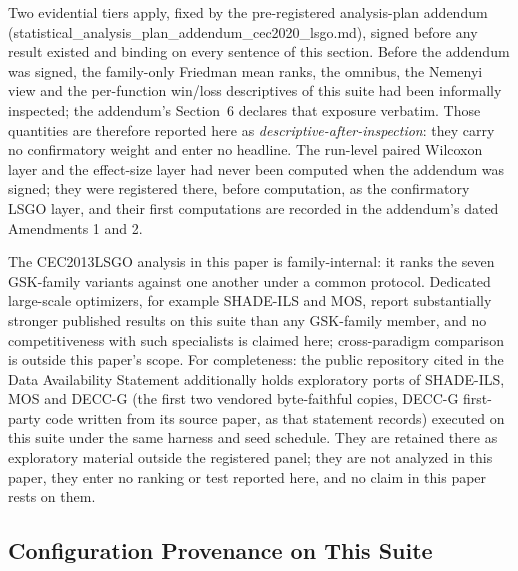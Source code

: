 \documentclass[algorithms,article,submit,moreauthors,pdftex]{Definitions/mdpi}
\begin{document}
Two evidential tiers apply, fixed by the pre-registered analysis-plan
addendum (statistical\_analysis\_plan\_addendum\_cec2020\_lsgo.md), signed
before any result existed and binding on every sentence of this section.
Before the addendum was signed, the family-only Friedman mean ranks, the
omnibus, the Nemenyi view and the per-function win/loss descriptives of
this suite had been informally inspected; the addendum's Section~6
declares that exposure verbatim.  Those quantities are therefore reported
here as \emph{descriptive-after-inspection}: they carry no confirmatory
weight and enter no headline.  The run-level paired Wilcoxon layer and the
effect-size layer had never been computed when the addendum was signed;
they were registered there, before computation, as the confirmatory LSGO
layer, and their first computations are recorded in the addendum's dated
Amendments 1 and 2.

The CEC2013LSGO analysis in this paper is family-internal: it ranks the
seven GSK-family variants against one another under a common protocol.
Dedicated large-scale optimizers, for example
SHADE-ILS and MOS,
report substantially stronger published results on this suite than any
GSK-family member, and no competitiveness with such specialists is claimed
here; cross-paradigm comparison is outside this paper's scope.
For completeness: the public repository cited in the Data Availability
Statement additionally holds exploratory ports of SHADE-ILS, MOS
and DECC-G (the first two vendored byte-faithful copies, DECC-G first-party
code written from its source paper, as that statement records) executed on
this suite under the same harness and seed schedule.
They are retained there as exploratory material outside the registered
panel; they are not analyzed in this paper, they enter no ranking or test
reported here, and no claim in this paper rests on them.

\subsection{Configuration Provenance on This Suite}\label{sec:supp:lsgo:config}
\end{document}

